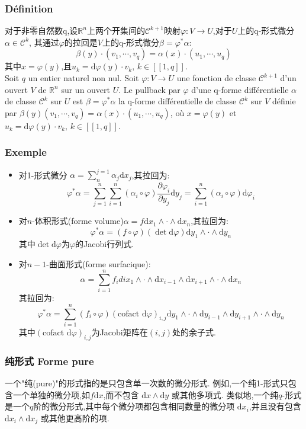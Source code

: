 \documentclass[12pt, a4paper, oneside]{ctexbook}
\newcommand{\di }{\text{d}}%
\newcommand{\pian }{\partial}%
\newcommand{\R }{\mathbb{R}}%
\newcommand{\fai }{\varphi}%
\newcommand{\C }{\mathcal{C}}%
\begin{document}
  \subsubsection{Définition}
  对于非零自然数q,设$\R^n$上两个开集间的$\C^{k+1}$映射$\fai:V\to U$,对于$U$上的q-形式微分$\alpha\in\C^k$,
  其通过$\fai$的拉回是$V$上的q-形式微分$\beta=\fai^*\alpha$:
  $$
  \beta(y)\cdot(v_1,\cdots,v_q)=\alpha(x)\cdot(u_1,\cdots,u_q)
  $$
  其中$x=\fai(y)$,且$u_k=\di \fai(y)\cdot v_k,\,k\in[\![1,q]\!]$.\\
  \indent
  Soit $q$ un entier naturel non nul. Soit $\fai:V\to U$ une fonction de classe $\C^{k+1}$ d'un ouvert $V$ de $\R^n$ sur un ouvert $U$.
  Le pullback par $\fai$ d'une q-forme différentielle $\alpha$ de classe $\C^k$ sur $U$ est $\beta=\fai^*\alpha$ la q-forme différentielle de classe $\C^k$ sur $V$ définie par 
  $\beta(y)(v_1,\cdots,v_q)=\alpha(x)\cdot(u_1,\cdots,u_q)$, où $x=\fai(y)$ et $u_k=\di \fai(y)\cdot v_k,\,k\in[\![1,q]\!]$.
  \subsubsection{Exemple}
  \begin{itemize}
    \item 对1-形式微分 $\alpha=\sum_{n}^{j=1}\alpha_j\di x_j$,其拉回为:
          $$
          \fai^*\alpha=\sum_{j=1}^{n}\sum_{i=1}^{n}(\alpha_i\circ \fai)\frac{\pian \fai_i}{\pian y_j}\di y_j=\sum_{i=1}^{n}(\alpha_i\circ \fai)\di\fai_i
          $$
    \item 对$n$-体积形式(forme volume)$\alpha=f\di x_1\wedge\cdot\wedge\di x_n$,其拉回为:
          $$
          \fai^*\alpha=(f\circ\fai)(\det\di\fai)\di y_1\wedge\cdot\wedge\di y_n
          $$
          其中$\det\di\fai$为$\fai$的Jacobi行列式.
    \item 对$n-1$-曲面形式(forme surfacique):
          $$
          \alpha=\sum_{i=1}^{n}f_idi x_1\wedge\cdot\wedge\di x_{i-1}\wedge\di x_{i+1}\wedge\cdot\wedge\di x_n
          $$
          其拉回为:
          $$
          \fai^*\alpha=\sum_{i=1}^{n}(f_i\circ\fai)(\text{cofact }\di\fai)_{i,j}\di y_1\wedge\cdot\wedge\di y_{i-1}\wedge\di y_{i+1}\wedge\cdot\wedge\di y_n
          $$
          其中$(\text{cofact }\di\fai)_{i,j}$为Jacobi矩阵在$(i,j)$处的余子式.
  \end{itemize}
  \subsubsection{纯形式 Forme pure}
  一个"纯(pure)"的形式指的是只包含单一次数的微分形式.
  例如,一个纯1-形式只包含一个单独的微分项,如$f \di x$,而不包含 $\di x \wedge \di y$ 或其他多项式.
  类似地,一个纯$q$-形式是一个$q$阶的微分形式,其中每个微分项都包含相同数量的微分项 $\di x_i$,并且没有包含 $\di x_i \wedge \di x_j$ 或其他更高阶的项.
\end{document}
